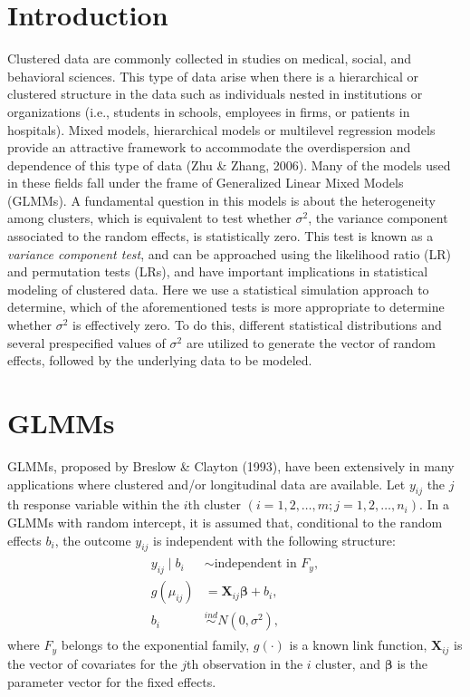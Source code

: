 \documentclass{sciposter}
\begin{document}
\begin{boldmath}
\begin{multicols}{3}
\section{Introduction}
Clustered data are commonly collected in studies on medical, social, and behavioral sciences. This type of data arise when there is a hierarchical or clustered structure in the data such as individuals nested in institutions or organizations (i.e., students in schools, employees in firms, or patients in hospitals). Mixed models, hierarchical models or multilevel regression models provide an attractive framework to accommodate the overdispersion and dependence of this type of data (Zhu \& Zhang, 2006). Many of the models used in these fields fall under the frame of Generalized Linear Mixed Models (GLMMs). A fundamental question in this models is about the heterogeneity among clusters, which is equivalent to test whether $\sigma^2$, the variance component associated to the random effects, is statistically zero. This test is known as a \textit{variance component test}, and can be approached using the likelihood ratio (LR) and permutation tests (LRs), and have important implications in statistical modeling of clustered data. Here we use a statistical simulation approach to determine, which of the aforementioned tests is more appropriate to determine whether $\sigma^2$ is effectively zero. To do this, different statistical distributions and several prespecified values of $\sigma^2$ are utilized to generate the vector of random effects, followed by the underlying data to be modeled. 
\section{GLMMs}
GLMMs, proposed by Breslow \& Clayton (1993), have been extensively in many applications where clustered and/or longitudinal data are available. Let $y_{ij}$ the $j$th response variable within the $i$th cluster $(i=1,2,\ldots,m; j=1,2,\ldots,n_i)$. In a GLMMs with random intercept, it is assumed that, conditional to the random effects $b_i$, the outcome $y_{ij}$ is  independent with the following structure:
\begin{align} \label{glmm_est}
\begin{split}
y_{ij} \mid b_i &\sim \text{independent in } F_y,  \\
g(\mu_{ij}) &= \boldsymbol{X}_{ij} \boldsymbol{\beta} + b_i ,  \\ 
b_i &\overset{ind}{\sim} N(0,\sigma^2), 
\end{split}
\end{align}
where $F_y$ belongs to the exponential family, $g(\cdot)$ is a known link function, $\boldsymbol{X}_{ij}$ is the vector of covariates for the $j$th observation in the $i$ cluster, and $\boldsymbol{\beta}$ is the parameter vector for the fixed effects.


\end{multicols}
\end{boldmath}
\end{document}
